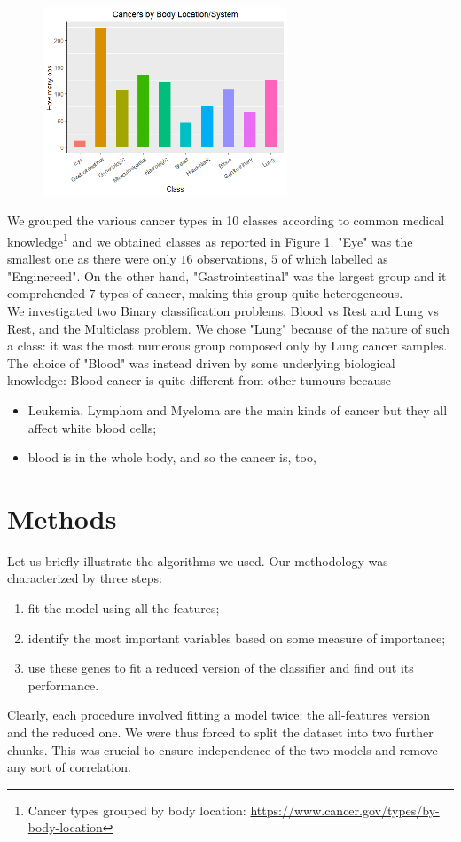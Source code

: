 \documentclass[a4paper,11pt, oneside]{article}  %
\begin{document}
	\begin{figure}
		\includegraphics[width=0.65\textwidth]{plot1.png}
		\label{fig1}
	\end{figure}
	We grouped the various cancer types in 10 classes according to common medical knowledge\footnote{Cancer types grouped by body location: \url{https://www.cancer.gov/types/by-body-location}} and we obtained classes as reported in Figure \ref{fig1}.  "Eye" was the smallest one as there were only $16$ observations, $5$ of which labelled as "Enginereed". On the other hand, "Gastrointestinal" was the largest group and it comprehended $7$ types of cancer,  making this group quite heterogeneous. \\
	We investigated two Binary classification problems, Blood vs Rest and Lung vs Rest, and the Multiclass problem. We chose "Lung" because of the nature of such a class: it was the most numerous group composed only by Lung cancer samples. The choice of "Blood" was instead driven by some underlying biological knowledge: Blood cancer is quite different from other tumours because
	\begin{itemize}
		\item Leukemia, Lymphom and Myeloma are the main kinds of cancer but they all affect white blood cells;
		\item blood is in the whole body, and so the cancer is, too,	
	\end{itemize} 
	
	\section{Methods}
	Let us briefly illustrate the algorithms we used. Our methodology was characterized by three steps:
	\begin{enumerate}
		\item fit the model using all the features;
		\item identify the most important variables based on some measure of importance;
		\item use these genes to fit a reduced version of the classifier and find out its performance.
	\end{enumerate}
	Clearly, each procedure involved fitting a model twice: the all-features version and the reduced one. We were thus forced to split the dataset into two further chunks. This was crucial to ensure independence of the two models and remove any sort of correlation.
	
\end{document}

